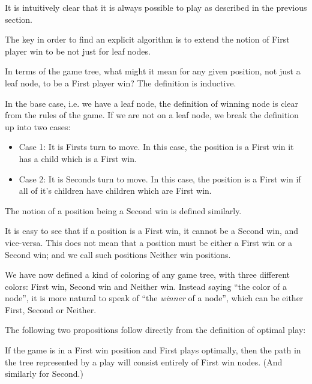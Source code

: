 It is intuitively clear that it is always possible to play as described in the previous section.

The key in order to find an explicit algorithm is to extend the notion of First player win to be not just for leaf nodes.

In terms of the game tree, what might it mean for any given position, not just a leaf node, to be a First player win?
The definition is inductive.

In the base case, i.e. we have a leaf node, the definition of winning node is clear from the rules of the game.
If we are not on a leaf node, we break the definition up into two cases:

\begin{definition}
\label{def:positionclasses}

\begin{itemize}

  \item Case 1: It is Firsts turn to move.
    In this case, the position is a First win it has a child which is a First win.
  \item Case 2: It is Seconds turn to move.
    In this case, the position is a First win if all of it's children have children which are First win.

\end{itemize}

\end{definition}

The notion of a position being a Second win is defined similarly.

It is easy to see that if a position is a First win, it cannot be a Second win, and vice-versa.
This does not mean that a position must be either a First win or a Second win; and we call such positions Neither win positions.

We have now defined a kind of coloring of any game tree, with three different colors: First win, Second win and Neither win.
Instead saying ``the color of a node'', it is more natural to speak of ``the \emph{winner} of a node'', which can be either First, Second or Neither.

The following two propositions follow directly from the definition of optimal play:

\begin{proposition}
If the game is in a First win position and First plays optimally, then the path in the tree represented by a play will consist entirely of First win nodes.
(And similarly for Second.)
\end{proposition}


